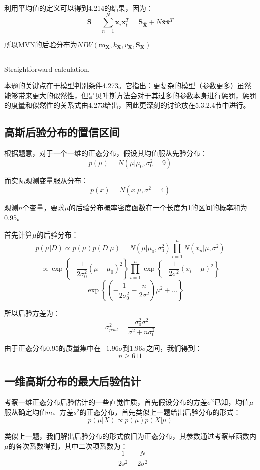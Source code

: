 \documentclass[UTF8]{ctexart}
\begin{document}
利用平均值的定义可以得到4.214的结果，因为：
$$\textbf{S}=\sum_{n=1}^{N}\textbf{x}_{i}\textbf{x}_{t}^{T} = \textbf{S}_{\bar{\textbf{X}}} + N \bar{\textbf{x}}\bar{\textbf{x}}^{T}$$

所以MVN的后验分布为$NIW(\textbf{m}_{\textbf{X}},k_{\textbf{X}},v_{\textbf{X}},\textbf{S}_{\textbf{X}})$

\subsection{}
Straightforward calculation.

本题的关键点在于模型判别条件4.273。它指出：更复杂的模型（参数更多）虽然能够带来更大的似然性，但是贝叶斯方法会对于其过多的参数本身进行惩罚，惩罚的度量和似然性的关系式由4.273给出，因此更深刻的讨论放在5.3.2.4节中进行。

\subsection{高斯后验分布的置信区间}
根据题意，对于一个一维的正态分布，假设其均值服从先验分布：
$$p(\mu) = N(\mu|\mu_{0},\sigma^{2}_{0} = 9)$$

而实际观测变量服从分布：
$$p(x) = N(x|\mu,\sigma^{2}=4)$$

观测$n$个变量，要求$\mu$的后验分布概率密度函数在一个长度为1的区间的概率和为0.95。

首先计算$\mu$的后验分布：
$$p(\mu|D) \propto p(\mu)p(D|\mu) = N(\mu|\mu_{0},\sigma^{2}_{0})\prod_{i=1}^{n}N(x_{n}|\mu,\sigma^{2})$$
$$\propto \exp\left\{-\frac{1}{2\sigma^{2}_{0}}(\mu-\mu_{0})^{2}  \right\} \prod_{i=1}^{n}\exp\left\{  -\frac{1}{2\sigma^{2}}(x_{i}-\mu)^{2}\right\}$$
$$=\exp\left\{ (-\frac{1}{2\sigma_{0}^{2}}-\frac{n}{2\sigma^{2}})\mu^{2} + ... \right\}$$

所以后验方差为：
$$\sigma^{2}_{post}=\frac{\sigma^{2}_{0}\sigma^{2}}{\sigma^{2}+n\sigma^{2}_{0}}$$

由于正态分布0.95的质量集中在$-1.96\sigma$到$1.96\sigma$之间，我们得到：
$$n \geq 611$$

\subsection{一维高斯分布的最大后验估计}
考察一维正态分布后验估计的一些直觉性质，首先假设分布的方差$\sigma^{2}$已知，均值$\mu$服从确定均值$m$、方差$s^{2}$的正态分布，首先类似上一题给出后验分布的形式：
$$p(\mu|X) \propto p(\mu)p(X|\mu)$$

类似上一题，我们解出后验分布的形式依旧为正态分布，其参数通过考察幂函数内$\mu$的各次系数得到，其中二次项系数为：
$$-\frac{1}{2s^{2}}-\frac{N}{2\sigma^{2}}$$
\end{document}
